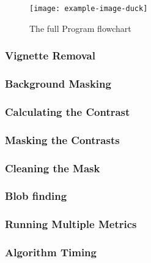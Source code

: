 \begin{figure}[h!]
    \centering
    \texttt{[image: example-image-duck]}
    \caption{The full Program flowchart}
\end{figure}

\subsubsection{Vignette Removal}


\subsubsection{Background Masking}


\subsubsection{Calculating the Contrast}


\subsubsection{Masking the Contrasts}


\subsubsection{Cleaning the Mask}


\subsubsection{Blob finding}


\subsubsection{Running Multiple Metrics}


\subsubsection{Algorithm Timing}
